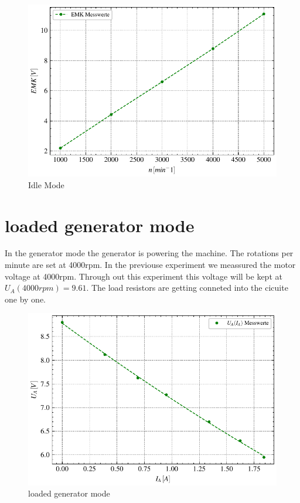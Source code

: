 \documentclass[conference]{IEEEtran}
\begin{document}
\begin{figure}[htbp]
    \centering
    \includegraphics[width=\columnwidth]{plots/4.1_Leerlaufversuch.pdf}
    \caption{Idle Mode}
    \label{fig:Anlaufmoment}
\end{figure}


\section{loaded generator mode}
In the generator mode the generator is powering the machine. The rotations per minute are set at 4000rpm.
In the previouse experiment we meassured the motor voltage at 4000rpm. Through out this experiment this voltage will be kept at $U_A(4000rpm) = 9.61$.
The load resistors are getting conneted into the cicuite one by one.


\begin{figure}[htbp]
    \centering
    \includegraphics[width=\columnwidth]{plots/4.2_Belasteter_Generator_4000.pdf}
    \caption{loaded generator mode}
    \label{fig:Anlaufmoment}
\end{figure}
\end{document}
